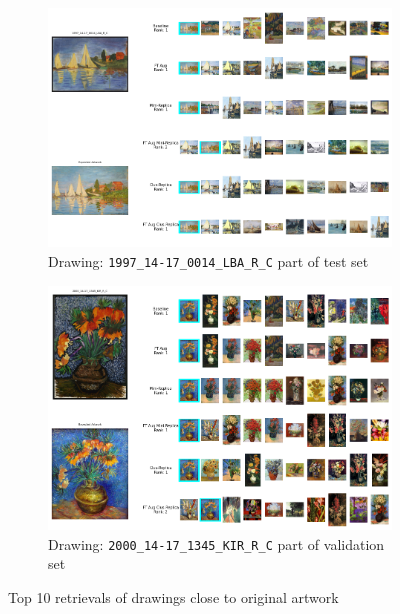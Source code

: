 {\begin{landscape}
\begin{figure}
\begin{subfigure}[b]{0.55\textwidth}
         \label{fig:1998_14-17_0627_CHN_R_C_crop}
     \end{subfigure}
     \hfil
     \begin{subfigure}[b]{0.55\textwidth}
         \centering
         \includegraphics[width=1.01\textwidth]{images/qualitative_analysis/1997_14-17_0014_LBA_R_C.png}
         \caption{Drawing: \texttt{1997\_14-17\_0014\_LBA\_R\_C} part of test set}
         \label{fig:1997_14-17_0014_LBA_R_C}
     \end{subfigure}
     \hfil
     \begin{subfigure}[b]{0.55\textwidth}
         \centering
         \includegraphics[width=1.01\textwidth]{images/qualitative_analysis/2000_14-17_1345_KIR_R_C.png}
         \caption{Drawing: \texttt{2000\_14-17\_1345\_KIR\_R\_C} part of validation set}
         \label{fig:2000_14-17_1345_KIR_R_C}
     \end{subfigure}
        \caption{Top 10 retrievals of drawings close to original artwork}
        \label{fig:baseline-best}
\end{figure}

    \end{landscape}
    \clearpage
}

